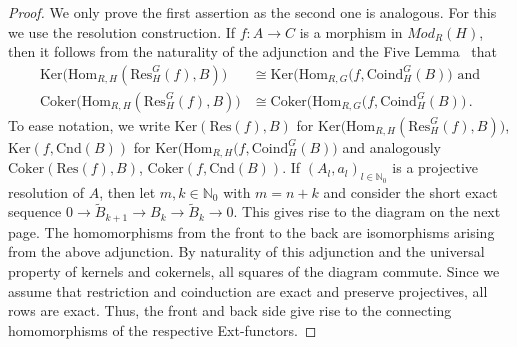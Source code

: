 \documentclass[12pt, a4paper]{article}
\numberwithin{equation}{section}
\theoremstyle{empty}
\theoremstyle{nonumberplain}
\newtheorem{proof}{Proof}
\begin{document}
\begin{proof}
We only prove the first assertion as the second one is analogous. For this we use the resolution construction. If $f: A \rightarrow C$ is a morphism in $Mod_R(H)$, then it follows from the naturality of the adjunction and the Five Lemma~\cite[Proposition~I.1.1]{car56} that
\begin{align*}
\mathrm{Ker}\big(\mathrm{Hom}_{R, H}(\mathrm{Res}_H^G(f), B)\big) &\cong \mathrm{Ker}\big(\mathrm{Hom}_{R, G}(f, \mathrm{Coind}_H^G(B)\big) \text{ and} \\
\mathrm{Coker}\big(\mathrm{Hom}_{R, H}(\mathrm{Res}_H^G(f), B)\big) &\cong \mathrm{Coker}\big(\mathrm{Hom}_{R, G}(f, \mathrm{Coind}_H^G(B)\big) \, .
\end{align*}
To ease notation, we write $\mathrm{Ker}(\mathrm{Res}(f), B)$ for $\mathrm{Ker}\big(\mathrm{Hom}_{R, H}(\mathrm{Res}_H^G(f), B)\big)$, $\mathrm{Ker}(f, \mathrm{Cnd}(B))$ for $\mathrm{Ker}\big(\mathrm{Hom}_{R, H}(f, \mathrm{Coind}_H^G(B)\big)$ and analogously $\mathrm{Coker}(\mathrm{Res}(f), B)$, $\mathrm{Coker}(f, \mathrm{Cnd}(B))$. If $(A_l, a_l)_{l \in \mathbb{N}_0}$ is a projective resolution of $A$, then let $m, k \in \mathbb{N}_0$ with $m = n+k$ and consider the short exact sequence $0 \rightarrow \widetilde{B}_{k+1} \rightarrow B_k \rightarrow \widetilde{B}_k \rightarrow 0$. This gives rise to the diagram on the next page. The homomorphisms from the front to the back are isomorphisms arising from the above adjunction. By naturality of this adjunction and the universal property of kernels and cokernels, all squares of the diagram commute. Since we assume that restriction and coinduction are exact and preserve projectives, all rows are exact. Thus, the front and back side give rise to the connecting homomorphisms of the respective Ext-functors.\pagebreak


\end{proof}
\end{document}
